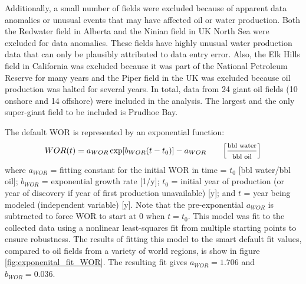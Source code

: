 \documentclass[11pt]{report}
\begin{document}
Additionally, a small number of fields were excluded because of apparent data anomalies or unusual events that may have affected oil or water production. Both the Redwater field in Alberta and the Ninian field in UK North Sea were excluded for data anomalies. These fields have highly unusual water production data that can only be plausibly attributed to data entry error. Also, the Elk Hills field in California was excluded because it was part of the National Petroleum Reserve for many years and the Piper field in the UK was excluded because oil production was halted for several years. In total, data from 24 giant oil fields (10 onshore and 14 offshore) were included in the analysis. The largest and the only super-giant field to be included is Prudhoe Bay.


The default WOR is represented by an exponential function:
\begin{equation}\label{eq:smart_default_WOR}
WOR(t) = a_{WOR} \exp [b_{WOR} ( t - t_0 )] - a_{WOR} \quad\quad \footnotesize{\left[\frac{\text{bbl water}}{\text{bbl oil}}\right]}
\end{equation}
where $a_{WOR}$ = fitting constant for the initial WOR in time = $t_0$ [bbl water/bbl oil]; $b_{WOR}$ = exponential growth rate [1/y]; $t_0$ = initial year of production (or year of discovery if year of first production unavailable) [y]; and $t$ = year being modeled (independent variable) [y]. Note that the pre-exponential $a_{WOR}$ is subtracted to force WOR to start at 0 when $t = t_0$. This model was fit to the collected data using a nonlinear least-squares fit from multiple starting points to ensure robustness.
The results of fitting this model to the smart default fit values, compared to oil fields from a variety of world regions, is show in figure \ref{fig:exponenital_fit_WOR}. The resulting fit gives $a_{WOR} = 1.706$ and $b_{WOR} = 0.036$.
\end{document}
